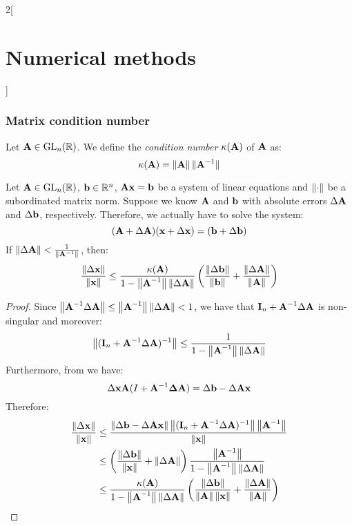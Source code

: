 \documentclass[../../../main_math.tex]{subfiles}
\begin{document}
\begin{multicols}{2}[\section{Numerical methods}]
  \subsubsection{Matrix condition number}
  \begin{definition}
    Let $\boldsymbol{\mathrm{A}}\in\mathrm{GL}_n(\mathbb{R})$. We define the \emph{condition number} $\kappa(\boldsymbol{\mathrm{A}})$ of $\boldsymbol{\mathrm{A}}$ as: $$\kappa(\boldsymbol{\mathrm{A}})=\left\|\boldsymbol{\mathrm{A}}\right\|\|\boldsymbol{\mathrm{A}}^{-1}\|$$
  \end{definition}
  \begin{theorem}\label{NM:cond_num_ineq}
    Let $\boldsymbol{\mathrm{A}}\in\mathrm{GL}_n(\mathbb{R})$, $\boldsymbol{\mathrm{b}}\in\mathbb{R}^n$, $\boldsymbol{\mathrm{A}}\boldsymbol{\mathrm{x}}=\boldsymbol{\mathrm{b}}$ be a system of linear equations and $\left\|\cdot\right\|$ be a subordinated matrix norm. Suppose we know $\boldsymbol{\mathrm{A}}$ and $\boldsymbol{\mathrm{b}}$ with absolute errors $\Delta\boldsymbol{\mathrm{A}}$ and $\Delta\boldsymbol{\mathrm{b}}$, respectively. Therefore, we actually have to solve the system:
    \begin{equation}\label{NM:Abx_errors}
      (\boldsymbol{\mathrm{A}}+\Delta\boldsymbol{\mathrm{A}})(\boldsymbol{\mathrm{x}}+\Delta \boldsymbol{\mathrm{x}})=(\boldsymbol{\mathrm{b}}+\Delta\boldsymbol{\mathrm{b}})
    \end{equation}
    If $\left\|\Delta\boldsymbol{\mathrm{A}}\right\|<\frac{1}{\left\|\boldsymbol{\mathrm{A}}^{-1}\right\|}$, then: $$\frac{\left\|\Delta \boldsymbol{\mathrm{x}}\right\|}{\left\|\boldsymbol{\mathrm{x}}\right\|}\leq\frac{\kappa(\boldsymbol{\mathrm{A}})}{1-\left\|\boldsymbol{\mathrm{A}}^{-1}\right\|\left\|\Delta\boldsymbol{\mathrm{A}}\right\|}\left(\frac{\left\|\Delta\boldsymbol{\mathrm{b}}\right\|}{\left\|\boldsymbol{\mathrm{b}}\right\|}+\frac{\left\|\Delta\boldsymbol{\mathrm{A}}\right\|}{\left\|\boldsymbol{\mathrm{A}}\right\|}\right)$$
  \end{theorem}
  \begin{proof}
    Since $\left\|\boldsymbol{\mathrm{A}}^{-1}\Delta\boldsymbol{\mathrm{A}}\right\|\leq \left\|\boldsymbol{\mathrm{A}}^{-1}\right\|\left\|\Delta\boldsymbol{\mathrm{A}}\right\|<1$, we have that $\boldsymbol{\mathrm{I}}_n+\boldsymbol{\mathrm{A}}^{-1}\Delta\boldsymbol{\mathrm{A}}$ is non-singular and moreover: $$\left\|(\boldsymbol{\mathrm{I}}_n+\boldsymbol{\mathrm{A}}^{-1}\Delta\boldsymbol{\mathrm{A}})^{-1}\right\|\leq\frac{1}{1-\left\|\boldsymbol{\mathrm{A}}^{-1}\right\|\left\|\Delta\boldsymbol{\mathrm{A}}\right\|}$$
    Furthermore, from  we have:
    $$
      \Delta\boldsymbol{\mathrm{x}}\boldsymbol{\mathrm{A}}(I+\boldsymbol{\mathrm{A}}^{-1}\boldsymbol{\mathrm{\Delta A}})=\Delta\boldsymbol{\mathrm{b}}-\Delta\boldsymbol{\mathrm{A}}\boldsymbol{\mathrm{x}}
    $$
    Therefore:
    \begin{align*}
      \frac{\norm{\Delta \vf{x}}}{\norm{\vf{x}}} & \leq\frac{\norm{\Delta\vf{b}-\Delta\vf{A}\vf{x}}\norm{(\vf{I}_n+\vf{A}^{-1}\Delta\vf{A})^{-1}}\norm{\vf{A}^{-1}}}{\norm{\vf{x}}}                                                \\
                                                 & \leq\left(\frac{\norm{\Delta\vf{b}}}{\norm{\vf{x}}}+\norm{\Delta\vf{A}}\right) \frac{\norm{\vf{A}^{-1}}}{1-\norm{\vf{A}^{-1}}\norm{\Delta\vf{A}}}                               \\
                                                 & \leq\frac{\kappa(\vf{A})}{1-\norm{\vf{A}^{-1}}\norm{\Delta\vf{A}}}\left(\frac{\norm{\Delta\vf{b}}}{\norm{\vf{A}}\norm{\vf{x}}}+\frac{\norm{\Delta\vf{A}}}{\norm{\vf{A}}}\right) \\

\end{align*}
\end{proof}
\end{multicols}
\end{document}
